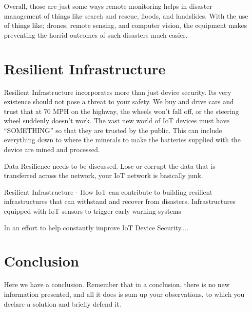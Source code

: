 \documentclass[conference]{IEEEtran}
\begin{document}
Overall, those are just some ways remote monitoring helps in disaster management of things like search and rescue,
floods, and landslides. With the use of things like; drones, remote sensing, and computer vision, the equipment
makes preventing the horrid outcomes of such disasters much easier.\par

\section{Resilient Infrastructure} %
Resilient Infrastructure incorporates more than just device security. Its very existence should not pose a threat
to your safety. We buy and drive cars and trust that at 70 MPH on the highway, the wheels won't fall off, or the
steering wheel suddenly doesn't work. The vast new world of IoT devices must have ``SOMETHING'' so that they are
trusted by the public. This can include everything down to where the minerals to make the batteries supplied with
the device are mined and processed. \par

Data Resilience \cite{b8} needs to be discussed. Lose or corrupt the data that is transferred across the network, your IoT network is basically junk.\par

Resilient Infrastructure - How IoT can contribute to building resilient infrastructures that can withstand and recover from disasters. Infrastructures equipped with IoT sensors to trigger early warning systems\par

In an effort to help constantly improve IoT Device Security....

\par

\par

\par

\par

\par

\section{Conclusion} %
Here we have a conclusion. Remember that in a conclusion, there is no new information presented, and all it 
does is sum up your observations, to which you declare a solution and briefly defend it.
\end{document}
